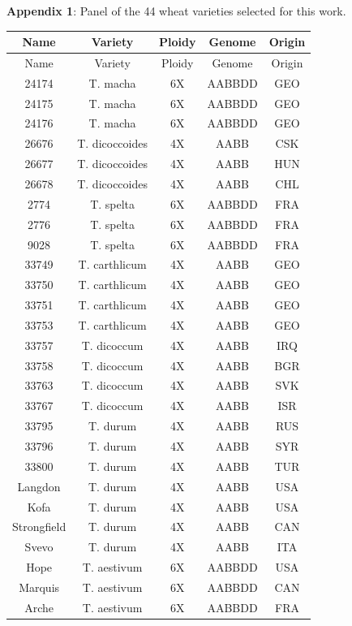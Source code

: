 \documentclass[a4paper, 12pt]{article}
\begin{document}
\newpage
\pagestyle{empty}
\textbf{Appendix 1}: Panel of the 44 wheat varieties selected for this work.
\setlongtables
\begin{longtable}{|c|c|c|c|c|}
\hline
Name & Variety & Ploidy & Genome & Origin \\
\hline
\endfirsthead
\hline
Name & Variety & Ploidy & Genome & Origin \\
\hline
\endhead
24174 & T. macha & 6X & AABBDD & GEO \\
24175 & T. macha & 6X & AABBDD & GEO \\
24176 & T. macha & 6X & AABBDD & GEO \\
26676 & T. dicoccoides & 4X & AABB & CSK \\
26677 & T. dicoccoides & 4X & AABB & HUN \\
26678 & T. dicoccoides & 4X & AABB & CHL \\
2774 & T. spelta & 6X & AABBDD & FRA \\
2776 & T. spelta & 6X & AABBDD & FRA \\
9028 & T. spelta & 6X & AABBDD & FRA \\
33749 & T. carthlicum & 4X & AABB & GEO \\
33750 & T. carthlicum & 4X & AABB & GEO \\
33751 & T. carthlicum & 4X & AABB & GEO \\
33753 & T. carthlicum & 4X & AABB & GEO \\
33757 & T. dicoccum & 4X & AABB & IRQ \\
33758 & T. dicoccum & 4X & AABB & BGR \\
33763 & T. dicoccum & 4X & AABB & SVK \\
33767 & T. dicoccum & 4X & AABB & ISR \\
33795 & T. durum & 4X & AABB & RUS \\
33796 & T. durum & 4X & AABB & SYR \\
33800 & T. durum & 4X & AABB & TUR \\
Langdon & T. durum & 4X & AABB & USA \\
Kofa & T. durum & 4X & AABB & USA \\
Strongfield & T. durum & 4X & AABB & CAN \\
Svevo & T. durum & 4X & AABB & ITA \\
Hope & T. aestivum & 6X & AABBDD & USA \\
Marquis & T. aestivum & 6X & AABBDD & CAN \\
Arche & T. aestivum & 6X & AABBDD & FRA \\

\end{longtable}
\end{document}
